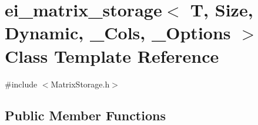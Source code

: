 \hypertarget{classei__matrix__storage_3_01_t_00_01_size_00_01_dynamic_00_01___cols_00_01___options_01_4}{\section{ei\-\_\-matrix\-\_\-storage$<$ T, Size, Dynamic, \-\_\-\-Cols, \-\_\-\-Options $>$ Class Template Reference}
\label{classei__matrix__storage_3_01_t_00_01_size_00_01_dynamic_00_01___cols_00_01___options_01_4}
}


{\ttfamily \#include $<$Matrix\-Storage.\-h$>$}

\subsection*{Public Member Functions}
